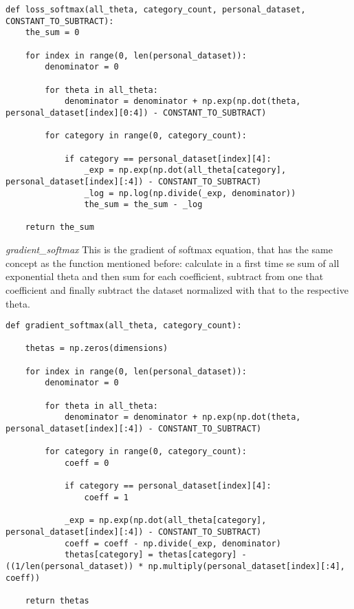 \documentclass[a4paper,11pt,oneside]{book}
\begin{document}
\begin{lstlisting}
def loss_softmax(all_theta, category_count, personal_dataset, CONSTANT_TO_SUBTRACT):
    the_sum = 0

    for index in range(0, len(personal_dataset)):
        denominator = 0

        for theta in all_theta:
            denominator = denominator + np.exp(np.dot(theta, personal_dataset[index][0:4]) - CONSTANT_TO_SUBTRACT)

        for category in range(0, category_count):

            if category == personal_dataset[index][4]:
                _exp = np.exp(np.dot(all_theta[category], personal_dataset[index][:4]) - CONSTANT_TO_SUBTRACT)
                _log = np.log(np.divide(_exp, denominator))
                the_sum = the_sum - _log

    return the_sum
\end{lstlisting}

\textit{gradient\_softmax} This is the gradient of softmax equation, that has the same concept as the function mentioned before: calculate in a
first time se sum of all exponential theta and then sum for each coefficient, subtract from one that coefficient and finally subtract the dataset
normalized with that to the respective theta.

\begin{lstlisting}
def gradient_softmax(all_theta, category_count):

    thetas = np.zeros(dimensions)

    for index in range(0, len(personal_dataset)):
        denominator = 0

        for theta in all_theta:
            denominator = denominator + np.exp(np.dot(theta, personal_dataset[index][:4]) - CONSTANT_TO_SUBTRACT)

        for category in range(0, category_count):
            coeff = 0

            if category == personal_dataset[index][4]:
                coeff = 1

            _exp = np.exp(np.dot(all_theta[category], personal_dataset[index][:4]) - CONSTANT_TO_SUBTRACT)
            coeff = coeff - np.divide(_exp, denominator)
            thetas[category] = thetas[category] - ((1/len(personal_dataset)) * np.multiply(personal_dataset[index][:4], coeff))

    return thetas
\end{lstlisting}
\end{document}

